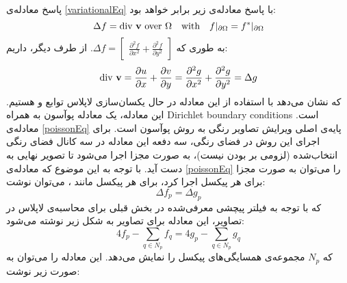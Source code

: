 پاسخ معادله‌ی \ref{variationalEq} با پاسخ معادله‌ی زیر برابر خواهد بود:
\begin{equation} \label{poissonEq}
	\Delta f = \textrm{div}\ \text{\textbf{v}}\ \textrm{over}\ \Omega \quad \textrm{with} \quad f|_{\partial \Omega} = f^*|_{\partial \Omega} 
\end{equation}
به طوری که 
$\Delta f = \begin{bmatrix}\frac{\partial^2 f}{\partial x^2} + \frac{\partial^2 f}{\partial y^2}\end{bmatrix}$.
از طرف دیگر، داریم:
\begin{equation}
	\textrm{div}\ \text{\textbf{v}} = \frac{\partial u}{\partial x} + \frac{\partial v}{\partial y} = \frac{\partial^2 g}{\partial x^2} + \frac{\partial^2 g}{\partial y^2} = \Delta g
\end{equation}
که نشان می‌دهد با استفاده از این معادله‌ در حال یکسان‌سازی لاپلاس توابع  و  هستیم. این معادله، یک معادله پوآسون به همراه \gls{Dirichlet boundary conditions} است.
\newline
معادله‌ی \ref{poissonEq} پایه‌ی اصلی ویرایش تصاویر رنگی به روش پوآسون است. برای اجرای این روش در فضای رنگی، سه دفعه این معادله در سه کانال فضای رنگی انتخاب‌شده (لزومی بر  بودن نیست)، به صورت مجزا اجرا می‌شود تا تصویر نهایی به دست آید.
\newline
با توجه به این موضوع که معادله‌ی \ref{poissonEq} را می‌توان به صورت مجزا برای هر پیکسل اجرا کرد، برای هر پیکسل مانند ، می‌توان نوشت:
\begin{equation}
	\Delta f_p = \Delta g_p
\end{equation}
که با توجه به فیلتر پیچشی معرفی‌شده در بخش قبلی برای محاسبه‌ی لاپلاس در تصاویر، این معادله برای تصاویر به شکل زیر نوشته می‌شود:
\begin{equation}
	4f_p - \sum_{q \in N_p} f_q = 4g_p - \sum_{q \in N_p}  g_q
\end{equation}
که $N_p$ مجموعه‌ی همسایگی‌های پیکسل  را نمایش می‌دهد. این معادله را می‌توان به صورت زیر نوشت:
\setcounter{MaxMatrixCols}{20}
